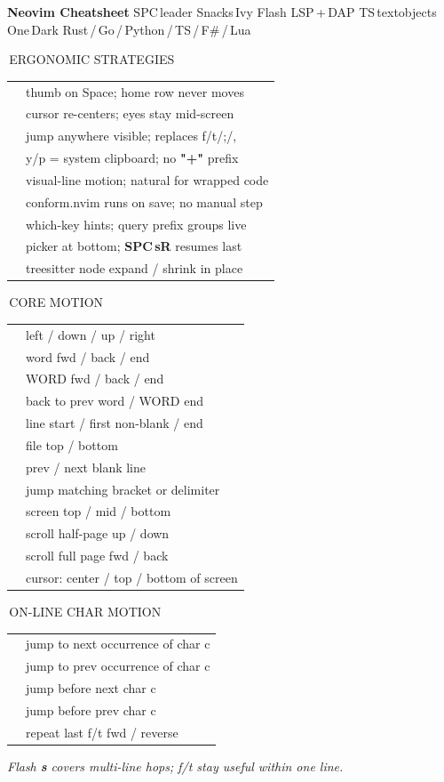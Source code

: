\documentclass[9pt,a4paper,landscape]{extarticle}
\makeatletter
\newcommand{\kbd}[1]{{\ttfamily\bfseries\footnotesize\color{keyclr}#1}}
\newcommand{\sect}[1]{%
  \vspace{0.5pt}%
  {\setlength{\fboxsep}{1pt}%
   \noindent\colorbox{hdrbg}{\parbox{\dimexpr\columnwidth-2pt\relax}{%
     \color{hdrfg}\bfseries\sffamily\small\strut\,#1}}}%
  \par\vspace{0pt}}
\newlength{\kdsep}\setlength{\kdsep}{0pt}
\newcommand{\kd}[2]{\kbd{#1} & #2 \\[\kdsep]}
\newenvironment{kt}{%
  \setlength{\tabcolsep}{0pt}%
  \begin{tabular}{@{}>{\footnotesize\raggedright\arraybackslash}p{17mm}@{\hspace{2pt}}>{\footnotesize\color{bodyclr}\raggedright\arraybackslash}p{\dimexpr\columnwidth-17mm-2pt\relax}@{}}%
}{%
  \end{tabular}\par}
\newcommand{\snote}[1]{{\scriptsize\color{noteclr}\textit{#1}}\par}
\makeatother
\begin{document}

{\setlength{\fboxsep}{4pt}%
 \noindent\colorbox{titlebg}{\parbox{\dimexpr\textwidth-8pt\relax}{%
   \centering\color{titlefg}%
   {\large\bfseries\sffamily Neovim Cheatsheet}\enspace
   {\small\color{hdrfg}%
    SPC\,leader\enspace\textbullet\enspace
    Snacks\,Ivy\enspace\textbullet\enspace
    Flash\enspace\textbullet\enspace
    LSP\,+\,DAP\enspace\textbullet\enspace
    TS\,textobjects\enspace\textbullet\enspace
    One\,Dark\enspace\textbullet\enspace
    Rust\,/\,Go\,/\,Python\,/\,TS\,/\,F\#\,/\,Lua}}}}
\vspace{1pt}

\begin{multicols}{5}

\sect{ERGONOMIC STRATEGIES}
\begin{kt}
\kd{SPC\,leader}{thumb on Space; home row never moves}
\kd{zz\,on\,jumps}{cursor re-centers; eyes stay mid-screen}
\kd{Flash\,s+2ch}{jump anywhere visible; replaces f/t/;/,}
\kd{unnamedplus}{y/p = system clipboard; no \kbd{"+"} prefix}
\kd{j/k=gj/gk}{visual-line motion; natural for wrapped code}
\kd{:w\,auto-fmt}{conform.nvim runs on save; no manual step}
\kd{800ms\,/\,SPC?}{which-key hints; query prefix groups live}
\kd{Snacks\,Ivy}{picker at bottom; \kbd{SPC\,sR} resumes last}
\kd{+/-\,visual}{treesitter node expand / shrink in place}
\end{kt}

\sect{CORE MOTION}
\begin{kt}
\kd{h\,j\,k\,l}{left / down / up / right}
\kd{w\,/\,b\,/\,e}{word fwd / back / end}
\kd{W\,/\,B\,/\,E}{WORD fwd / back / end}
\kd{ge\,/\,gE}{back to prev word / WORD end}
\kd{0\,/\,\textasciicircum\,/\,\$}{line start / first non-blank / end}
\kd{gg\,/\,G}{file top / bottom}
\kd{\{\,/\,\}}{prev / next blank line}
\kd{\%}{jump matching bracket or delimiter}
\kd{H\,/\,M\,/\,L}{screen top / mid / bottom}
\kd{C-u\,/\,C-d}{scroll half-page up / down}
\kd{C-f\,/\,C-b}{scroll full page fwd / back}
\kd{zz\,/\,zt\,/\,zb}{cursor: center / top / bottom of screen}
\end{kt}

\sect{ON-LINE CHAR MOTION}
\begin{kt}
\kd{f\{c\}}{jump to next occurrence of char c}
\kd{F\{c\}}{jump to prev occurrence of char c}
\kd{t\{c\}}{jump before next char c}
\kd{T\{c\}}{jump before prev char c}
\kd{;\,/\,,}{repeat last f/t fwd / reverse}
\end{kt}
\snote{Flash \kbd{s} covers multi-line hops; f/t stay useful within one line.}


\end{multicols}
\end{document}
